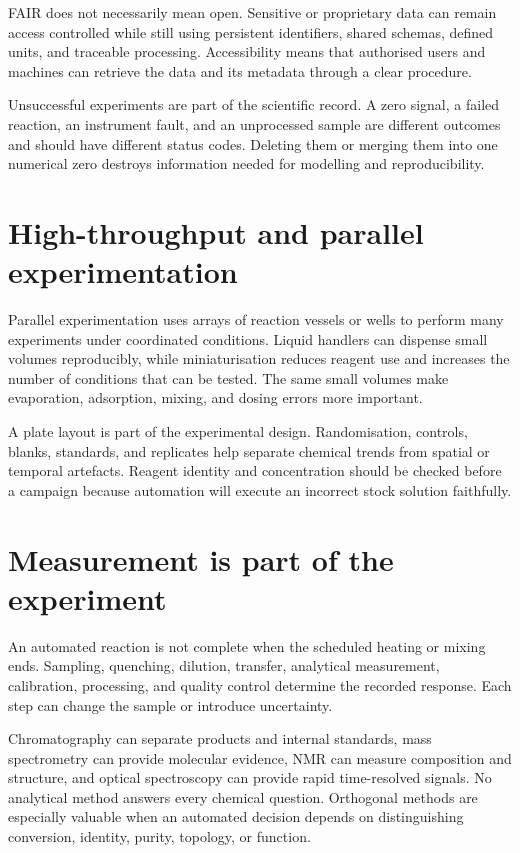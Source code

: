 FAIR does not necessarily mean open.
Sensitive or proprietary data can remain access controlled while still using persistent identifiers, shared schemas, defined units, and traceable processing.
Accessibility means that authorised users and machines can retrieve the data and its metadata through a clear procedure.

Unsuccessful experiments are part of the scientific record.
A zero signal, a failed reaction, an instrument fault, and an unprocessed sample are different outcomes and should have different status codes.
Deleting them or merging them into one numerical zero destroys information needed for modelling and reproducibility.

\section{High-throughput and parallel experimentation}

Parallel experimentation uses arrays of reaction vessels or wells to perform many experiments under coordinated conditions.
Liquid handlers can dispense small volumes reproducibly, while miniaturisation reduces reagent use and increases the number of conditions that can be tested.
The same small volumes make evaporation, adsorption, mixing, and dosing errors more important.

A plate layout is part of the experimental design.
Randomisation, controls, blanks, standards, and replicates help separate chemical trends from spatial or temporal artefacts.
Reagent identity and concentration should be checked before a campaign because automation will execute an incorrect stock solution faithfully.

\section{Measurement is part of the experiment}

An automated reaction is not complete when the scheduled heating or mixing ends.
Sampling, quenching, dilution, transfer, analytical measurement, calibration, processing, and quality control determine the recorded response.
Each step can change the sample or introduce uncertainty.

Chromatography can separate products and internal standards, mass spectrometry can provide molecular evidence, NMR can measure composition and structure, and optical spectroscopy can provide rapid time-resolved signals.
No analytical method answers every chemical question.
Orthogonal methods are especially valuable when an automated decision depends on distinguishing conversion, identity, purity, topology, or function.

